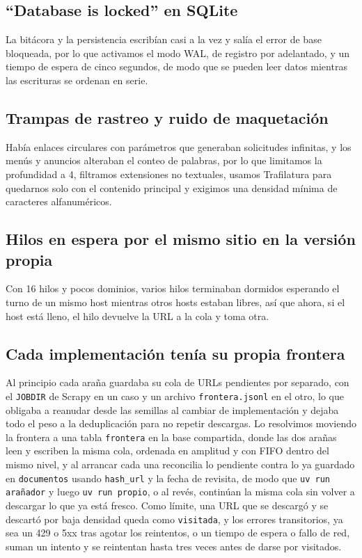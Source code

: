 \documentclass[11pt,spanish]{article}
\begin{document}
\subsection{``Database is locked'' en SQLite}

La bitácora y la persistencia escribían casi a la vez y salía el error de base bloqueada, por lo que activamos el modo WAL, de registro por adelantado, y un tiempo de espera de cinco segundos, de modo que se pueden leer datos mientras las escrituras se ordenan en serie.

\subsection{Trampas de rastreo y ruido de maquetación}

Había enlaces circulares con parámetros que generaban solicitudes infinitas, y los menús y anuncios alteraban el conteo de palabras, por lo que limitamos la profundidad a 4, filtramos extensiones no textuales, usamos Trafilatura para quedarnos solo con el contenido principal y exigimos una densidad mínima de caracteres alfanuméricos.

\subsection{Hilos en espera por el mismo sitio en la versión propia}

Con 16 hilos y pocos dominios, varios hilos terminaban dormidos esperando el turno de un mismo host mientras otros hosts estaban libres, así que ahora, si el host está lleno, el hilo devuelve la URL a la cola y toma otra.

\subsection{Cada implementación tenía su propia frontera}

Al principio cada araña guardaba su cola de URLs pendientes por separado, con el \texttt{JOBDIR} de Scrapy en un caso y un archivo \texttt{frontera.jsonl} en el otro, lo que obligaba a reanudar desde las semillas al cambiar de implementación y dejaba todo el peso a la deduplicación para no repetir descargas. Lo resolvimos moviendo la frontera a una tabla \texttt{frontera} en la base compartida, donde las dos arañas leen y escriben la misma cola, ordenada en amplitud y con FIFO dentro del mismo nivel, y al arrancar cada una reconcilia lo pendiente contra lo ya guardado en \texttt{documentos} usando \texttt{hash\_url} y la fecha de revisita, de modo que \texttt{uv run arañador} y luego \texttt{uv run propio}, o al revés, continúan la misma cola sin volver a descargar lo que ya está fresco. Como límite, una URL que se descargó y se descartó por baja densidad queda como \texttt{visitada}, y los errores transitorios, ya sea un 429 o 5xx tras agotar los reintentos, o un tiempo de espera o fallo de red, suman un intento y se reintentan hasta tres veces antes de darse por visitados.
\end{document}
